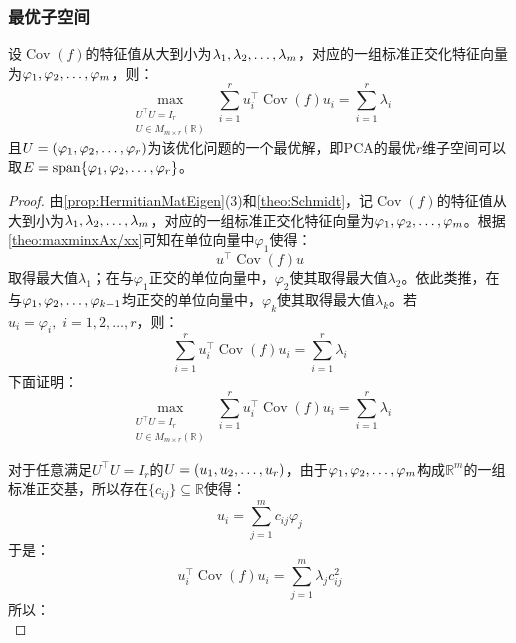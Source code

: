 \subsubsection{最优子空间}
\begin{theorem}\label{theo:PCA}
	设$\operatorname{Cov}(f)$的特征值从大到小为$\lambda_1, \lambda_2, \dots, \lambda_{m}$，对应的一组标准正交化特征向量为$\varphi_1, \varphi_2, \dots, \varphi_{m}$，则：
	\begin{equation*}
		\underset{\substack{U^{\top}U=I_r\\U\in M_{m\times r}(\mathbb{R})}}{\max}\;\sum_{i=1}^{r}u_i^{\top}\operatorname{Cov}(f)u_i=\sum_{i=1}^{r}\lambda_i
	\end{equation*}
	且$U=(\varphi_1, \varphi_2, \dots, \varphi_{r})$为该优化问题的一个最优解，即PCA的最优$r$维子空间可以取$E=\operatorname{span}\{\varphi_1, \varphi_2, \dots, \varphi_{r}\}$。
\end{theorem}
\begin{proof}
	由\cref{prop:HermitianMatEigen}(3)和\cref{theo:Schmidt}，记$\operatorname{Cov}(f)$的特征值从大到小为$\lambda_1, \lambda_2, \dots, \lambda_{m}$，对应的一组标准正交化特征向量为$\varphi_1, \varphi_2, \dots, \varphi_{m}$。根据\cref{theo:maxminxAx/xx}可知在单位向量中$\varphi_1$使得：
	\begin{equation*}
		u^{\top}\operatorname{Cov}(f)u
	\end{equation*}
	取得最大值$\lambda_1$；在与$\varphi_1$正交的单位向量中，$\varphi_2$使其取得最大值$\lambda_2$。依此类推，在与$\varphi_1, \varphi_2, \dots, \varphi_{k-1}$均正交的单位向量中，$\varphi_k$使其取得最大值$\lambda_k$。若$u_i=\varphi_i,\;i=1,2,\dots,r$，则：
	\begin{equation*}
		\sum_{i=1}^{r}u_i^{\top}\operatorname{Cov}(f)u_i=\sum_{i=1}^{r}\lambda_i
	\end{equation*}
	下面证明：
	\begin{equation*}
		\underset{\substack{U^{\top}U=I_r\\U\in M_{m\times r}(\mathbb{R})}}{\max}\;\sum_{i=1}^{r}u_i^{\top}\operatorname{Cov}(f)u_i=\sum_{i=1}^{r}\lambda_i
	\end{equation*}\par
	对于任意满足$U^{\top}U=I_r$的$U=(u_1, u_2, \dots, u_{r})$，由于$\varphi_1, \varphi_2, \dots, \varphi_{m}$构成$\mathbb{R}^m$的一组标准正交基，所以存在$\{c_{ij}\}\subseteq\mathbb{R}$使得：
	\begin{equation*}
		u_i=\sum_{j=1}^{m}c_{ij}\varphi_j
	\end{equation*}
	于是：
	\begin{equation*}
		u_i^{\top}\operatorname{Cov}(f)u_i=\sum_{j=1}^{m}\lambda_jc_{ij}^2
	\end{equation*}
	所以：
	\begin{equation*}

\end{equation*}
\end{proof}
